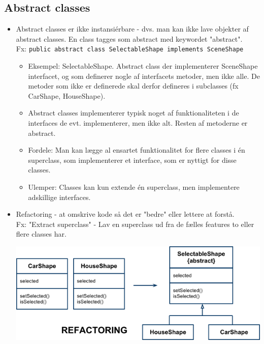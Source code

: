 \subsection{Abstract classes}

\begin{itemize}
  \item Abstract classes er ikke instansiérbare - dvs. man kan ikke lave objekter af abstract classes. En class tagges som abstract med keywordet "abstract".\\
  Fx: \verb|public abstract class SelectableShape implements SceneShape|
  \begin{itemize}
    \item Eksempel: SelectableShape. Abstract class der implementerer SceneShape interfacet, og som definerer nogle af interfacets metoder, men ikke alle. De metoder som ikke er definerede skal derfor defineres i subclasses (fx CarShape, HouseShape).
    \item Abstract classes implementerer typisk noget af funktionaliteten i de interfaces de evt. implementerer, men ikke alt. Resten af metoderne er abstract.
    \item Fordele: Man kan lægge al ensartet funktionalitet for flere classes i én superclass, som implementerer et interface, som er nyttigt for disse classes.
    \item Ulemper: Classes kan kun extende én superclass, men implementere adskillige interfaces.
  \end{itemize}
  
  \item Refactoring - at omskrive kode så det er "bedre" eller lettere at forstå.\\
  Fx: "Extract superclass" - Lav en superclass ud fra de fælles features to eller flere classes har.
  
  \begin{center}
    \includegraphics[scale=0.6]{images/refactor_to_template_method_pattern.png}
  \end{center}


\end{itemize}
